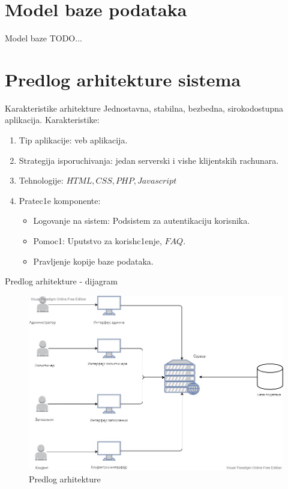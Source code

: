 \documentclass[11pt]{beamer}
\begin{document}
\section{Model baze podataka}
\begin{frame}{Model baze}
TODO...
\end{frame}

\section{Predlog arhitekture sistema}
\begin{frame}{Karakteristike arhitekture}
 Jednostavna, stabilna, bezbedna, sirokodostupna aplikacija.
Karakteristike:
\begin{enumerate}
    \item Tip aplikacije: veb aplikacija.
    \item Strategija isporuchivanja: jedan serverski i vishe klijentskih rachunara.
    \item Tehnologije: $HTML, CSS, PHP, Javascript$
    \item Pratec1e komponente:
    \begin{itemize}
        \item Logovanje na sistem: Podsistem za autentikaciju korisnika.
        \item Pomoc1: Uputstvo za korish\-c1enje, $FAQ.$
        \item Pravljenje kopije baze podataka.
    \end{itemize}
    
\end{enumerate}
\end{frame}
\begin{frame}{Predlog arhitekture - dijagram}
 \begin{figure}
     \centering
     \includegraphics[scale=0.25]{Slike/Arhitektura/arhitektura .jpg}
     \caption{Predlog arhitekture}
 \end{figure}
 \end{frame}
\end{document}
